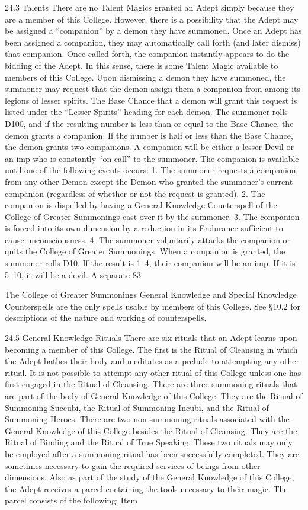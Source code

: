 \documentclass[a4paper]{article}
\begin{document}
\begin{multicols}{3}
24.3 Talents
There are no Talent Magics granted an Adept
simply because they are a member of this College.
However, there is a possibility that the Adept may
be assigned a “companion” by a demon they have
summoned. Once an Adept has been assigned a
companion, they may automatically call forth (and
later dismiss) that companion. Once called forth,
the companion instantly appears to do the bidding
of the Adept. In this sense, there is some Talent
Magic available to members of this College.
Upon dismissing a demon they have summoned,
the summoner may request that the demon assign
them a companion from among its legions of lesser
spirits. The Base Chance that a demon will grant
this request is listed under the “Lesser Spirits”
heading for each demon. The summoner rolls
D100, and if the resulting number is less than or
equal to the Base Chance, the demon grants a
companion. If the number is half or less than the
Base Chance, the demon grants two companions.
A companion will be either a lesser Devil or an
imp who is constantly “on call” to the summoner.
The companion is available until one of the following events occurs:
1. The summoner requests a companion from any
other Demon except the Demon who granted the
summoner’s current companion (regardless of
whether or not the request is granted).
2. The companion is dispelled by having a General
Knowledge Counterspell of the College of Greater
Summonings cast over it by the summoner.
3. The companion is forced into its own dimension
by a reduction in its Endurance sufficient to cause
unconsciousness.
4. The summoner voluntarily attacks the companion or quits the College of Greater Summonings.
When a companion is granted, the summoner rolls
D10. If the result is 1–4, their companion will be
an imp. If it is 5–10, it will be a devil. A separate
83

The College of Greater Summonings General
Knowledge and Special Knowledge Counterspells
are the only spells usable by members of this College. See §10.2 for descriptions of the nature and
working of counterspells.

24.5 General Knowledge Rituals
There are six rituals that an Adept learns upon
becoming a member of this College. The first is the
Ritual of Cleansing in which the Adept bathes their
body and meditates as a prelude to attempting any
other ritual. It is not possible to attempt any other
ritual of this College unless one has first engaged
in the Ritual of Cleansing. There are three summoning rituals that are part of the body of General
Knowledge of this College. They are the Ritual of
Summoning Succubi, the Ritual of Summoning
Incubi, and the Ritual of Summoning Heroes.
There are two non-summoning rituals associated
with the General Knowledge of this College besides the Ritual of Cleansing. They are the Ritual
of Binding and the Ritual of True Speaking. These
two rituals may only be employed after a summoning ritual has been successfully completed. They
are sometimes necessary to gain the required services of beings from other dimensions.
Also as part of the study of the General Knowledge
of this College, the Adept receives a parcel containing the tools necessary to their magic. The
parcel consists of the following:
Item


\end{multicols}
\end{document}
